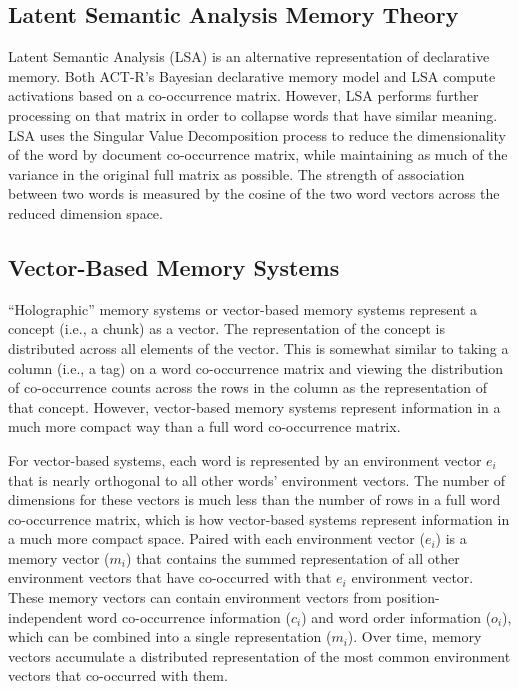 \documentclass[man,donotrepeattitle]{apa6}
\begin{document}
\subsection{Latent Semantic Analysis Memory Theory}

Latent Semantic Analysis \parencite{Landauer1997} (LSA) is an alternative representation of declarative memory.
Both ACT-R's Bayesian declarative memory model and LSA compute activations based on a co-occurrence matrix.
However, LSA performs further processing on that matrix in order to collapse words that have similar meaning.
LSA uses the Singular Value Decomposition process to reduce the dimensionality of the word by document co-occurrence matrix, while maintaining as much of the variance in the original full matrix as possible.
The strength of association between two words is measured by the cosine of the two word vectors across the reduced dimension space.

\subsection{Vector-Based Memory Systems}

``Holographic'' memory systems \parencite{Plate1995} or vector-based memory systems represent a concept (i.e., a chunk) as a vector.
The representation of the concept is distributed across all elements of the vector.
This is somewhat similar to taking a column (i.e., a tag) on a word co-occurrence matrix and viewing the distribution of co-occurrence counts across the rows in the column as the representation of that concept.
However, vector-based memory systems represent information in a much more compact way than a full word co-occurrence matrix.

For vector-based systems, each word is represented by an environment vector $e_{i}$ that is nearly orthogonal to all other words' environment vectors.
The number of dimensions for these vectors is much less than the number of rows in a full word co-occurrence matrix, which is how vector-based systems represent information in a much more compact space.
Paired with each environment vector ($e_{i}$) is a memory vector ($m_{i}$) that contains the summed representation of all other environment vectors that have co-occurred with that $e_{i}$ environment vector.
These memory vectors can contain environment vectors from position-independent word co-occurrence information ($c_{i}$) and word order information ($o_{i}$), which can be combined into a single representation ($m_{i}$).
Over time, memory vectors accumulate a distributed representation of the most common environment vectors that co-occurred with them.
\end{document}
